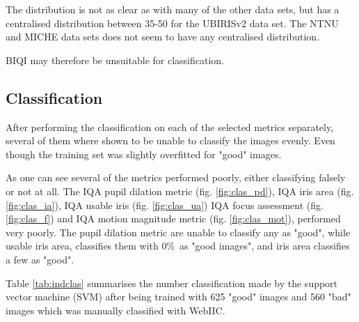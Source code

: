 The distribution is not as clear as with many of the other data sets, but has a
centralised distribution between 35-50 for the UBIRISv2 data set. The NTNU and
MICHE data sets does not seem to have any centralised distribution.

BIQI may therefore be unsuitable for classification.



\subsection{Classification}
After performing the classification on each of the selected metrics separately,
several of them where shown to be unable to classify the images evenly.  Even
though the training set was slightly overfitted for "good" images.

As one can see several of the metrics performed poorly, either classifying
falsely or not at all.  The IQA pupil dilation metric (fig. \ref{fig:clas_pd}),
IQA iris area (fig. \ref{fig:clas_ia}), IQA usable iris (fig. \ref{fig:clas_ua})
IQA focus assessment (fig. \ref{fig:clas_f}) and IQA motion magnitude metric
(fig. \ref{fig:clas_mot}), performed very poorly.  The pupil dilation metric are
unable to classify any as "good", while usable iris area, classifies them
with 0\%\ as "good images", and iris area classifies a few as "good".

Table \ref{tab:indclas} summarises the number classification made by the support
vector machine (SVM) after being trained with 625 "good" images and 560 "bad"
images which was manually classified with WebIIC\cite{webiic}.

